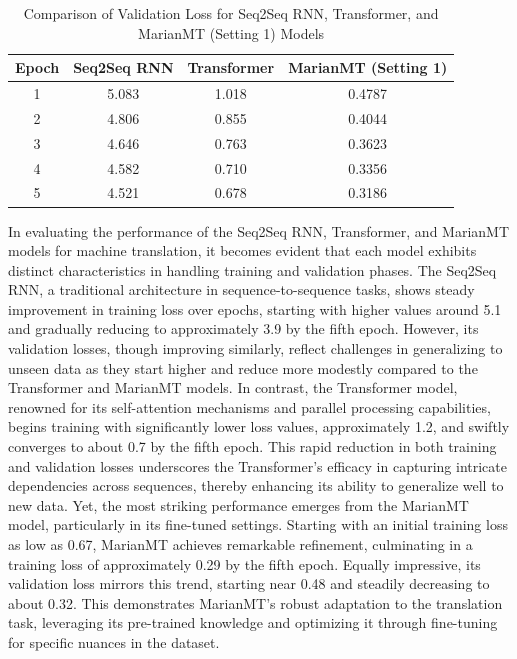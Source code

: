 \documentclass{article}
\begin{document}
\begin{table}[H]
\centering
\begin{tabular}{|c|c|c|c|}
\hline
\textbf{Epoch} & \textbf{Seq2Seq RNN} & \textbf{Transformer} & \textbf{MarianMT (Setting 1)} \\
\hline
1 & 5.083 & 1.018 & 0.4787 \\
2 & 4.806 & 0.855 & 0.4044 \\
3 & 4.646 & 0.763 & 0.3623 \\
4 & 4.582 & 0.710 & 0.3356 \\
5 & 4.521 & 0.678 & 0.3186 \\
\hline
\end{tabular}
\caption{Comparison of Validation Loss for Seq2Seq RNN, Transformer, and MarianMT (Setting 1) Models}
\end{table}
In evaluating the performance of the Seq2Seq RNN, Transformer, and MarianMT models for machine translation, it becomes evident that each model
exhibits distinct characteristics in handling training and validation phases. The
Seq2Seq RNN, a traditional architecture in sequence-to-sequence tasks, shows
steady improvement in training loss over epochs, starting with higher values
around 5.1 and gradually reducing to approximately 3.9 by the fifth epoch.
However, its validation losses, though improving similarly, reflect challenges in
generalizing to unseen data as they start higher and reduce more modestly compared to the Transformer and MarianMT models.
In contrast, the Transformer model, renowned for its self-attention mechanisms and parallel processing capabilities, begins training with significantly
lower loss values, approximately 1.2, and swiftly converges to about 0.7 by the
fifth epoch. This rapid reduction in both training and validation losses underscores the Transformer’s efficacy in capturing intricate dependencies across
sequences, thereby enhancing its ability to generalize well to new data.
Yet, the most striking performance emerges from the MarianMT model,
particularly in its fine-tuned settings. Starting with an initial training loss
as low as 0.67, MarianMT achieves remarkable refinement, culminating in a
training loss of approximately 0.29 by the fifth epoch. Equally impressive, its
validation loss mirrors this trend, starting near 0.48 and steadily decreasing to
about 0.32. This demonstrates MarianMT’s robust adaptation to the translation
task, leveraging its pre-trained knowledge and optimizing it through fine-tuning
for specific nuances in the dataset.
\end{document}
